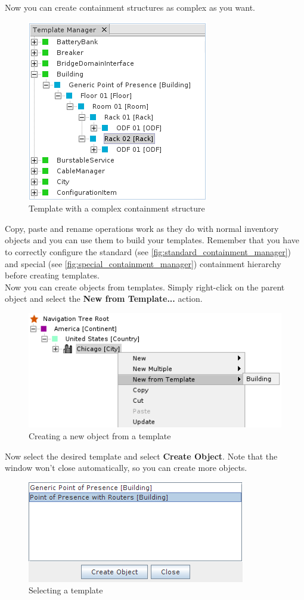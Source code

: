 \documentclass[a4paper]{article}
\begin{document}
	Now you can create containment structures as complex as you want.\\
	
	\begin{figure}[h!]
		\centering
		\includegraphics[width=0.4\linewidth]{img/template_manager_template_containment.png}
		\caption{Template with a complex containment structure}
		\label{fig:template_manager_template_containment}
	\end{figure}
	Copy, paste and rename operations work as they do with normal inventory objects and you can use them to build your templates. Remember that you have to correctly configure the standard (see \ref{fig:standard_containment_manager}) and special (see \ref{fig:special_containment_manager}) containment hierarchy before creating templates.\\
	Now you can create objects from templates. Simply right-click on the parent object and select the \textbf{New from Template...} action.\\
	\begin{figure}[h!]
		\centering
		\includegraphics[width=0.6\linewidth]{img/template_manager_new_from_template.png}
		\caption{Creating a new object from a template}
		\label{fig:template_manager_new_from_template}
	\end{figure}
	
	\newpage
	Now select the desired template and select \textbf{Create Object}. Note that the window won't close automatically, so you can create more objects.
	\begin{figure}[h!]
		\centering
		\includegraphics[width=0.5\linewidth]{img/template_manager_select_template.png}
		\caption{Selecting a template}
		\label{fig:template_manager_select_template}
	\end{figure}
	
\end{document}
